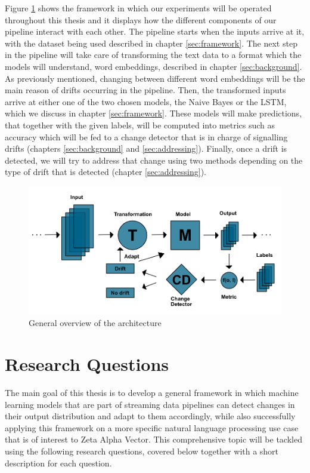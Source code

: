\documentclass[12pt]{extreport}
\begin{document}
Figure \ref{fig:framework} shows the framework in which our experiments will be operated throughout this thesis and it displays how the different components of our pipeline interact with each other. The pipeline starts when the inputs arrive at it, with the dataset being used described in chapter \ref{sec:framework}. The next step in the pipeline will take care of transforming the text data to a format which the models will understand, word embeddings, described in chapter \ref{sec:background}. As previously mentioned, changing between different word embeddings will be the main reason of drifts occurring in the pipeline. Then, the transformed inputs arrive at either one of the two chosen models, the Naive Bayes or the LSTM, which we discuss in chapter \ref{sec:framework}. These models will make predictions, that together with the given labels, will be computed into metrics such as accuracy which will be fed to a change detector that is in charge of signalling drifts (chapters \ref{sec:background} and \ref{sec:addressing}). Finally, once a drift is detected, we will try to address that change using two methods depending on the type of drift that is detected (chapter \ref{sec:addressing}).

\begin{figure}[ht!]
\centering
\includegraphics[width=\linewidth]{assets/introduction/framework.png}
\caption{General overview of the architecture}
\label{fig:framework}
\end{figure}

\section{Research Questions}

The main goal of this thesis is to develop a general framework in which machine learning models that are part of streaming data pipelines can detect changes in their output distribution and adapt to them accordingly, while also successfully applying this framework on a more specific natural language processing use case that is of interest to Zeta Alpha Vector. This comprehensive topic will be tackled using the following research questions, covered below together with a short description for each question.
\end{document}
